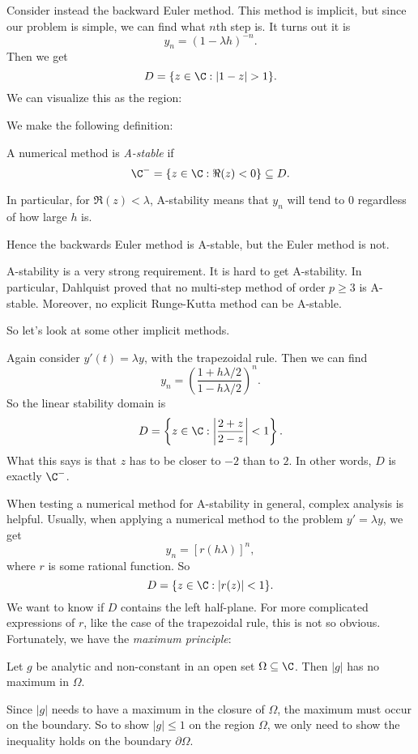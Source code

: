 \documentclass[a4paper]{article}
\begin{document}
\begin{eg}
  Consider instead the backward Euler method. This method is implicit, but since our problem is simple, we can find what $n$th step is. It turns out it is
  \[
    y_n = (1 - \lambda h)^{-n}.
  \]
  Then we get
  \[
    D = \{z \in \C: |1 - z| > 1\}.
  \]
  We can visualize this as the region:
  \begin{center}
  \end{center}
\end{eg}
We make the following definition:
\begin{defi}[A-stability]
  A numerical method is \emph{A-stable} if
  \[
    \C^- = \{z \in \C: \Re(z) < 0\} \subseteq D.
  \]
\end{defi}
In particular, for $\Re(z) < \lambda$, A-stability means that $y_n$ will tend to $0$ regardless of how large $h$ is.

Hence the backwards Euler method is A-stable, but the Euler method is not.

A-stability is a very strong requirement. It is hard to get A-stability. In particular, Dahlquist proved that no multi-step method of order $p \geq 3$ is A-stable. Moreover, no explicit Runge-Kutta method can be A-stable.

So let's look at some other implicit methods.
\begin{eg}
  Again consider $y'(t) = \lambda y$, with the trapezoidal rule. Then we can find
  \[
    y_n = \left(\frac{1 + h\lambda/2}{1 - h\lambda/2}\right)^n.
  \]
  So the linear stability domain is
  \[
    D = \left\{z \in \C: \left|\frac{2 + z}{2 - z}\right| < 1 \right\}.
  \]
  What this says is that $z$ has to be closer to $-2$ than to $2$. In other words, $D$ is exactly $\C^-$.
\end{eg}

When testing a numerical method for A-stability in general, complex analysis is helpful. Usually, when applying a numerical method to the problem $y' = \lambda y$, we get
\[
  y_n = [r(h\lambda)]^n,
\]
where $r$ is some rational function. So
\[
  D = \{z \in \C: |r(z)| < 1\}.
\]
We want to know if $D$ contains the left half-plane. For more complicated expressions of $r$, like the case of the trapezoidal rule, this is not so obvious. Fortunately, we have the \emph{maximum principle}:
\begin{thm}
  Let $g$ be analytic and non-constant in an open set $\Omega \subseteq \C$. Then $|g|$ has no maximum in $\Omega$.
\end{thm}
Since $|g|$ needs to have a maximum in the closure of $\Omega$, the maximum must occur on the boundary. So to show $|g| \leq 1$ on the region $\Omega$, we only need to show the inequality holds on the boundary $\partial \Omega$.
\end{document}
